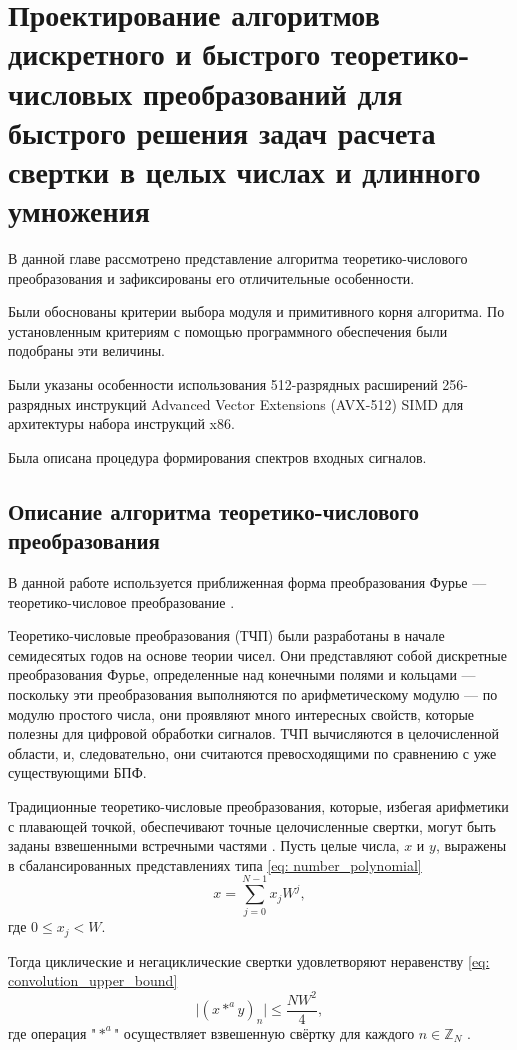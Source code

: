 \chapter{Проектирование алгоритмов дискретного и быстрого теоретико-числовых преобразований для быстрого решения задач расчета свертки в целых числах и длинного умножения}
В данной главе рассмотрено представление алгоритма теоретико-числового преобразования и зафиксированы его отличительные особенности.

Были обоснованы критерии выбора модуля и примитивного корня алгоритма.
По установленным критериям с помощью программного обеспечения были подобраны эти величины.

Были указаны особенности использования 512-разрядных расширений 256-разрядных инструкций Advanced Vector Extensions (AVX-512) SIMD для архитектуры набора инструкций x86.

Была описана процедура формирования спектров входных сигналов.
\section{Описание алгоритма теоретико-числового преобразования}
В данной работе используется приближенная форма преобразования Фурье –-- теоретико-числовое преобразование \cite{NTT-Lattice}.

Теоретико-числовые преобразования (ТЧП) были разработаны в начале семидесятых годов на основе теории чисел.
Они представляют собой дискретные преобразования Фурье, определенные над конечными полями и кольцами --- поскольку эти преобразования выполняются по арифметическому модулю --- по модулю простого числа, они проявляют много интересных свойств, которые полезны для цифровой обработки сигналов.
ТЧП вычисляются в целочисленной области, и, следовательно, они считаются превосходящими по сравнению с уже существующими БПФ.

Традиционные теоретико-числовые преобразования, которые, избегая арифметики с плавающей точкой, обеспечивают точные целочисленные свертки, могут быть заданы взвешенными встречными частями \cite{FFT-convolutions}.
Пусть целые числа, $x$ и $y$, выражены в сбалансированных представлениях типа \eqref{eq: number_polynomial}
\begin{equation}\label{eq: number_polynomial}
x = \sum_{j=0}^{N-1} x_j W^j,
\end{equation}
где $0 \leq x_j < W$.

Тогда циклические и негациклические свертки удовлетворяют неравенству \eqref{eq: convolution_upper_bound}
\begin{equation}\label{eq: convolution_upper_bound}
\big\vert(x *^a y)_n\big\vert \leq \frac{N W^2}{4},
\end{equation}
где операция "$*^a$" осуществляет взвешенную свёртку для каждого $n\in\mathbb{Z}_N$ \cite{FFT-convolutions}.

